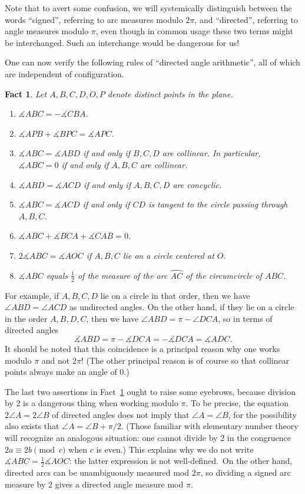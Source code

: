 \documentclass[12pt]{book}
\numberwithin{exc}{section}
\numberwithin{figure}{section}
\newtheorem{fact}[theorem]{Fact}
\numberwithin{equation}{theorem}
\def\ii{\item}
\def\ang{\angle}
\def\half{\frac{1}{2}}
\def\dang{\measuredangle} %
\def\arc#1{\wideparen{#1}}
\begin{document}
Note that to avert some confusion, we will systemically distinguish between the words ``signed'', referring to arc measures modulo $2\pi$, and ``directed'', referring to angle measures modulo $\pi$, even though in common usage these two terms might be interchanged. Such an interchange would be dangerous for us!

One can now verify the following rules of ``directed angle 
arithmetic'', all of which are independent of configuration.
\begin{fact} \label{fact:directed angles}
Let $A,B,C,D,O,P$ denote distinct points in the plane.
\begin{enumerate}
\ii
$\dang ABC = -\dang CBA$.
\ii
$\dang APB + \dang BPC = \dang APC$.
\ii
$\dang ABC = \dang ABD$ if and only if $B,C,D$ are collinear.
In particular, $\dang ABC = 0$ if and only if $A,B,C$ are collinear.
\ii
$\dang ABD = \dang ACD$ if and only if $A,B,C,D$ are concyclic.
\ii
$\dang ABC = \dang ACD$ if and only if $CD$ is tangent to the circle 
passing through $A,B,C$.
\ii
$\dang ABC + \dang BCA + \dang CAB = 0$.
\ii
$2\dang ABC = \dang AOC$ if $A,B,C$ lie on a circle centered at $O$.
\ii
$\dang ABC$ equals $\half$ of the measure of the arc $\arc{AC}$ of
the circumcircle of $ABC$.
\end{enumerate}
\end{fact}
For example, if $A,B,C,D$ lie on a circle in that order, then we 
have $\ang ABD = \ang ACD$ as undirected angles. On the other hand, if 
they lie on a circle in the order $A,B,D,C$, then we have
$\ang ABD = \pi - \ang DCA$, so in terms of directed angles
\[
\dang ABD = \pi - \dang DCA = - \dang DCA = \dang ADC.
\]
It should be noted that this coincidence is a principal reason why 
one works modulo $\pi$ and not $2\pi$! (The other principal reason is 
of course so that collinear points always make an angle of 0.)

The last two assertions in Fact~\ref{fact:directed angles} ought to raise some eyebrows, because division by 2 is a dangerous thing when working modulo $\pi$.
To be precise, the
equation $2\angle A = 2\angle B$ of directed angles does not imply 
that $\angle A = \angle B$, for the possibility also exists that 
$\angle A = \angle B + \pi/2$. (Those familiar with elementary number 
theory will recognize an analogous situation: one cannot divide by 2 
in the congruence $2a \equiv 2b \pmod{c}$ when $c$ is even.) This 
explains why we do not write $\dang ABC = \half \dang AOC$: the latter 
expression is not well-defined.\
On the other hand, directed arcs can be unambiguously measured mod 
$2\pi$, so dividing a signed arc measure by 2 gives a directed angle measure
mod $\pi$. 
\end{document}
